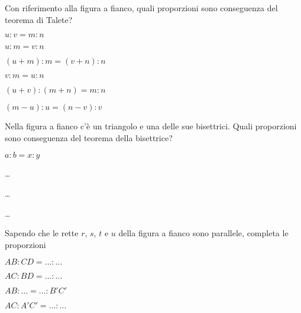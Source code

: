 \noindent\begin{minipage}{0.6\textwidth}\parindent15pt
\begin{esercizio}
\label{ese:6.32}
Con riferimento alla figura a fianco, quali proporzioni sono conseguenza del teorema di Talete?
\begin{enumeratea}
\item $u : v = m : n$
\item $u : m = v : n$
\item $(u+m) : m = (v+n) : n$
\item $v : m = u : n$
\item $(u + v) : (m + n) = m : n$
\item $(m-u) : u = (n-v) : v$
\end{enumeratea}
\end{esercizio}
\end{minipage}\hfil
\begin{minipage}{0.4\textwidth}
	\centering
\end{minipage}\vspace{4pt}

\noindent\begin{minipage}{0.6\textwidth}\parindent15pt
\begin{esercizio}
\label{ese:6.33}
Nella figura a fianco c'è un triangolo e una delle sue bisettrici. Quali proporzioni sono conseguenza del teorema della bisettrice?
\begin{enumeratea}
\item $a : b = x : y$
\item \ldots{}
\item \ldots{}
\item \ldots{}
\end{enumeratea}
\end{esercizio}
\end{minipage}\hfil
\begin{minipage}{0.4\textwidth}
	\centering
\end{minipage}

\noindent\begin{minipage}{0.6\textwidth}\parindent15pt
\begin{esercizio}
\label{ese:6.34}
Sapendo che le rette $r$, $s$, $t$ e $u$ della figura a fianco sono parallele, completa le proporzioni
\begin{enumeratea}
\item $AB : CD = \ldots{} : \ldots{}$
\item $AC : BD = \ldots{} : \ldots{}$
\item $AB : \ldots{} = \ldots{} : B'C'$
\item $AC : A'C' = \ldots{} : \ldots{}$
\end{enumeratea}
\end{esercizio}
\end{minipage}\hfil
\begin{minipage}{0.4\textwidth}
	\centering
\end{minipage}

